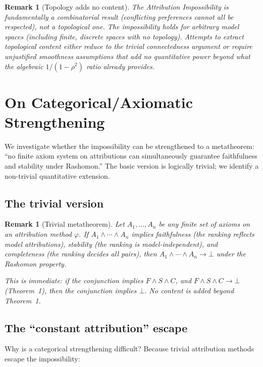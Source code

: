 \documentclass{article}
\newtheorem{remark}[theorem]{Remark}
\begin{document}
\begin{remark}[Topology adds no content]
\label{rem:topology-trivial}
The Attribution Impossibility is fundamentally a \emph{combinatorial}
result (conflicting preferences cannot all be respected), not a
\emph{topological} one. The impossibility holds for arbitrary model
spaces (including finite, discrete spaces with no topology). Attempts
to extract topological content either reduce to the trivial
connectedness argument or require unjustified smoothness assumptions
that add no quantitative power beyond what the algebraic
$1/(1-\rho^2)$ ratio already provides.
\end{remark}


\section{On Categorical/Axiomatic Strengthening}
\label{sec:categorical}

We investigate whether the impossibility can be strengthened to a
metatheorem: ``no finite axiom system on attributions can
simultaneously guarantee faithfulness and stability under
Rashomon.'' The basic version is logically trivial; we identify
a non-trivial quantitative extension.

\subsection{The trivial version}

\begin{remark}[Trivial metatheorem]
Let $A_1, \ldots, A_n$ be any finite set of axioms on an
attribution method $\varphi$. If $A_1 \wedge \cdots \wedge A_n$
implies faithfulness (the ranking reflects model attributions),
stability (the ranking is model-independent), and completeness
(the ranking decides all pairs), then
$A_1 \wedge \cdots \wedge A_n \to \bot$ under the Rashomon property.

This is immediate: if the conjunction implies $F \wedge S \wedge C$,
and $F \wedge S \wedge C \to \bot$ (Theorem~1), then the conjunction
implies $\bot$. No content is added beyond Theorem~1.
\end{remark}

\subsection{The ``constant attribution'' escape}

Why is a categorical strengthening difficult? Because trivial
attribution methods escape the impossibility:
\end{document}
